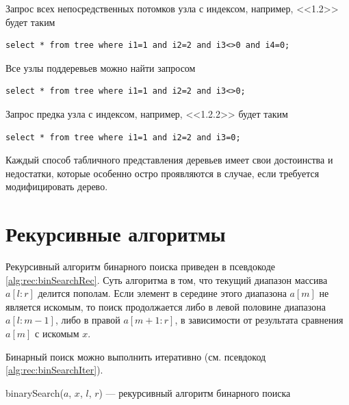 Запрос всех непосредственных потомков узла с индексом, например, <<1.2>> будет таким
\begin{verbatim}
select * from tree where i1=1 and i2=2 and i3<>0 and i4=0;
\end{verbatim}

Все узлы поддеревьев можно найти запросом
\begin{verbatim}
select * from tree where i1=1 and i2=2 and i3<>0;
\end{verbatim}

Запрос предка узла с индексом, например, <<1.2.2>> будет таким
\begin{verbatim}
select * from tree where i1=1 and i2=2 and i3=0;
\end{verbatim}

Каждый способ табличного представления деревьев имеет свои достоинства и недостатки, которые особенно остро проявляются в случае, если требуется модифицировать дерево.


\section{Рекурсивные алгоритмы}

Рекурсивный алгоритм бинарного поиска приведен в псевдокоде \ref{alg:rec:binSearchRec}. Суть алгоритма в том, что текущий диапазон массива $a[l:r]$ делится пополам. Если элемент в середине этого диапазона $a[m]$ не является искомым, то поиск продолжается либо в левой половине диапазона $a[l:m-1]$, либо в правой $a[m+1:r]$, в зависимости от результата сравнения $a[m]$ с искомым $x$.

Бинарный поиск можно выполнить итеративно (см. псевдокод \ref{alg:rec:binSearchIter}).

\begin{algorithm}
    \caption{binarySearch($a$, $x$, $l$, $r$) --- рекурсивный алгоритм бинарного поиска}
    \label{alg:rec:binSearchRec}
    \begin{algorithmic}[1]

        \ELSE
            \ELSE
                \ELSE
                \ENDIF
            \ENDIF
        \ENDIF

    \end{algorithmic}
\end{algorithm}

